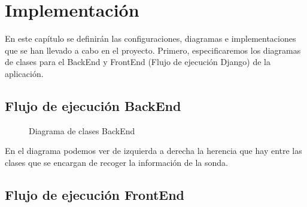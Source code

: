 \chapter{Implementación}
\label{chap:implementación}

En este capítulo se definirán las configuraciones, diagramas e implementaciones que se han llevado a cabo en el proyecto. Primero, especificaremos los diagramas de clases para el BackEnd y FrontEnd (Flujo de ejecución Django) de la aplicación.

\section{Flujo de ejecución BackEnd}

\begin{figure}[H]
  \caption{Diagrama de clases BackEnd}
\end{figure}

En el diagrama podemos ver de izquierda a derecha la herencia que hay entre las clases que se encargan de recoger la información de la sonda.\\

\section{Flujo de ejecución FrontEnd}


